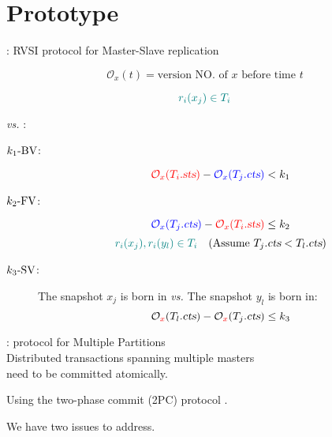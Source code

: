 \section{\chameleon{} Prototype}



\begin{frame}{}
  \centerline{\rvsims{}: RVSI protocol for Master-Slave replication}

  \vspace{-0.80cm}
  \begin{center}
    \resizebox{0.50\textwidth}{!}{}
  \end{center}
\end{frame}

\begin{frame}{}
  \[
    \mathcal{O}_{x}(t) = \text{version NO. of } x \text{ before time } t %
  \]


  \[
    \textcolor{teal}{r_i(x_j) \in T_i}
  \]
  \begin{center}
     \emph{vs.} :
  \end{center}

  \vspace{-0.40cm}
  \begin{description}
    \item[$k_1\text{-BV}$:]
      \[
	\textcolor{red}{\mathcal{O}_{x}(T_i.\textsl{sts})} - \textcolor{blue}{\mathcal{O}_{x}(T_j.\textsl{cts})} < k_1
      \]
    \item[$k_2\text{-FV}$:]
      \[
	\textcolor{blue}{\mathcal{O}_{x}(T_j.\textsl{cts})} - \textcolor{red}{\mathcal{O}_{x}(T_i.\textsl{sts})} \le k_2
      \]
    \pause
      \[
	\textcolor{teal}{r_i(x_j), r_i(y_l) \in T_i} \quad (\text{Assume } T_j.\textsl{cts} < T_l.\textsl{cts})
      \]
    \item[$k_3\text{-SV}$:] The snapshot $x_j$ is born in \emph{vs.} The snapshot $y_l$ is born in:
      \[
	\mathcal{O}_{\textcolor{red}{x}}(T_l.\textsl{cts}) - \mathcal{O}_{\textcolor{red}{x}}(T_j.\textsl{cts}) \le k_3
      \]
  \end{description}
\end{frame}

\begin{frame}{}
  \begin{center}
    \rvsimp{}: \rvsi{} protocol for Multiple Partitions\\[10pt]
    Distributed transactions spanning multiple masters \\
    need to be committed atomically.

    \pause
    \vspace{0.40cm}
    Using the two-phase commit (2PC) protocol .

    \pause
    \vspace{1.00cm}
    We have two issues to address.
  \end{center}
\end{frame}

